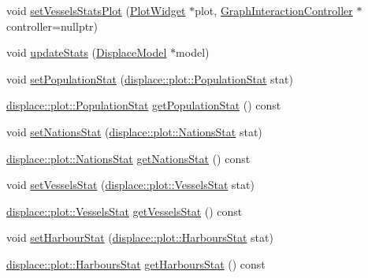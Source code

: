 \begin{DoxyCompactItemize}
\item 
void \mbox{\hyperlink{class_stats_controller_a8f35f8b064453901f85d9ffb7b2c156d}{set\+Vessels\+Stats\+Plot}} (\mbox{\hyperlink{class_plot_widget}{Plot\+Widget}} $\ast$plot, \mbox{\hyperlink{class_graph_interaction_controller}{Graph\+Interaction\+Controller}} $\ast$controller=nullptr)
\item 
void \mbox{\hyperlink{class_stats_controller_ae56ff943601c798965b524a886d1bc17}{update\+Stats}} (\mbox{\hyperlink{class_displace_model}{Displace\+Model}} $\ast$model)
\item 
void \mbox{\hyperlink{class_stats_controller_a709b2b11f58b038a2f04796f6773ab3d}{set\+Population\+Stat}} (\mbox{\hyperlink{namespacedisplace_1_1plot_a523612c6239ff69acc3e5b7c5b40b618}{displace\+::plot\+::\+Population\+Stat}} stat)
\item 
\mbox{\hyperlink{namespacedisplace_1_1plot_a523612c6239ff69acc3e5b7c5b40b618}{displace\+::plot\+::\+Population\+Stat}} \mbox{\hyperlink{class_stats_controller_a0cbedafee3a42961ee7e8e2920063347}{get\+Population\+Stat}} () const
\item 
void \mbox{\hyperlink{class_stats_controller_afbfc66b599bb7782828e38e8837ab141}{set\+Nations\+Stat}} (\mbox{\hyperlink{namespacedisplace_1_1plot_ab7b96ae3ae291a71823f371d77f27d98}{displace\+::plot\+::\+Nations\+Stat}} stat)
\item 
\mbox{\hyperlink{namespacedisplace_1_1plot_ab7b96ae3ae291a71823f371d77f27d98}{displace\+::plot\+::\+Nations\+Stat}} \mbox{\hyperlink{class_stats_controller_a8db26fa9aa997bd73f35d1afcdce184a}{get\+Nations\+Stat}} () const
\item 
void \mbox{\hyperlink{class_stats_controller_a914a8f1afeba5b329355a6708d4d5863}{set\+Vessels\+Stat}} (\mbox{\hyperlink{namespacedisplace_1_1plot_aa453098d286017edd5b0ff3f15ba1013}{displace\+::plot\+::\+Vessels\+Stat}} stat)
\item 
\mbox{\hyperlink{namespacedisplace_1_1plot_aa453098d286017edd5b0ff3f15ba1013}{displace\+::plot\+::\+Vessels\+Stat}} \mbox{\hyperlink{class_stats_controller_ac6ce071b7ab4012c5957a7ae2aec9f78}{get\+Vessels\+Stat}} () const
\item 
void \mbox{\hyperlink{class_stats_controller_a8103697a8db6e077b8e2621db3e938f7}{set\+Harbour\+Stat}} (\mbox{\hyperlink{namespacedisplace_1_1plot_a006fcde9bb7e602d977226ff75cb67aa}{displace\+::plot\+::\+Harbours\+Stat}} stat)
\item 
\mbox{\hyperlink{namespacedisplace_1_1plot_a006fcde9bb7e602d977226ff75cb67aa}{displace\+::plot\+::\+Harbours\+Stat}} \mbox{\hyperlink{class_stats_controller_a557b15092f574f5793d723ff20f65052}{get\+Harbours\+Stat}} () const

\end{DoxyCompactItemize}
